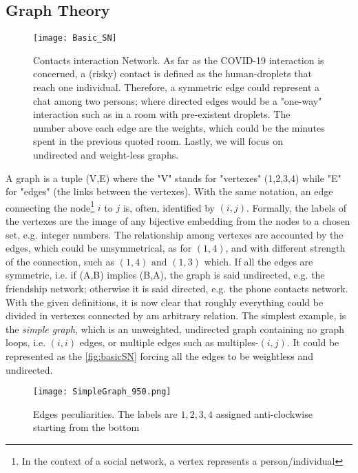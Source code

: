 \documentclass[a4paper,10pt]{book} %
\theoremstyle{definition}
\begin{document}
\subsection{Graph Theory}
\label{sec:GraphTheory}
\begin{figure}[htbp]
	\centering
	\texttt{[image: Basic\_SN]}
	\caption{Contacts interaction Network. As far as the COVID-19 interaction is concerned, a (risky) contact is defined as the human-droplets that reach one individual. Therefore, a symmetric edge could represent a chat among two persons; where directed edges would be a "one-way" interaction such as in a room with pre-existent droplets. The number above each edge are the weights, which could be the minutes spent in the previous quoted room. Lastly, we will focus on undirected and weight-less graphs.}
	\label{fig:basicSN}
\end{figure}

A graph is a tuple (V,E) where the "V" stands for "vertexes" (1,2,3,4) while "E" for "edges" (the links between the vertexes).
With the same notation, an edge connecting the node\footnote{In the context of a social network, a vertex represents a person/individual} $i$ to $j$ is, often, identified by $(i,j)$.
Formally, the labels of the vertexes are the image of any bijective embedding from the nodes to a chosen set, e.g. integer numbers. The relationship among vertexes are accounted by the edges, which could be unsymmetrical, as for $(1,4)$, and with different strength of the connection, such as $(1,4) \text{ and } (1,3)$ which. If all the edges are symmetric, i.e. if (A,B) implies (B,A), the graph is said undirected, e.g. the friendship network; otherwise it is said directed, e.g. the phone contacts network. 
With the given definitions, it is now clear that roughly everything could be divided in vertexes connected by am arbitrary relation.
The simplest example, is the \textit{simple graph}, which is an unweighted, undirected graph containing no graph loops, i.e. $(i,i)$ edges, or multiple edges such as multiples-$(i,j)$. It could be represented as the \autoref{fig:basicSN} forcing all the edges to be weightless and undirected.
\begin{figure}[ht]
	\texttt{[image: SimpleGraph\_950.png]}
	\caption{Edges peculiarities. The labels are $1,2,3,4$ assigned anti-clockwise starting from the bottom}
	\label{fig:simple}
\end{figure}
\end{document}
